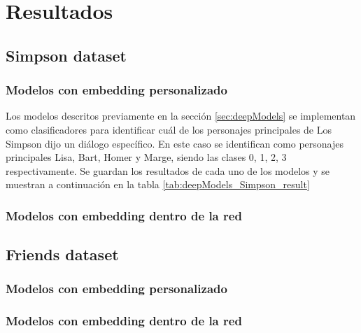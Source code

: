 \section{Resultados}

\subsection{Simpson dataset}

\subsubsection{Modelos con embedding personalizado}

Los modelos descritos previamente en la sección \ref{sec:deepModels} se implementan como clasificadores para identificar cuál de los personajes principales de Los Simpson dijo un diálogo específico. En este caso se identifican como personajes principales Lisa, Bart, Homer y Marge, siendo las clases 0, 1, 2, 3 respectivamente. Se guardan los resultados de cada uno de los modelos y se muestran a continuación en la tabla \ref{tab:deepModels_Simpson_result}\\





\subsubsection{Modelos con embedding dentro de la red}


\subsection{Friends dataset}

\subsubsection{Modelos con embedding personalizado}
\subsubsection{Modelos con embedding dentro de la red}